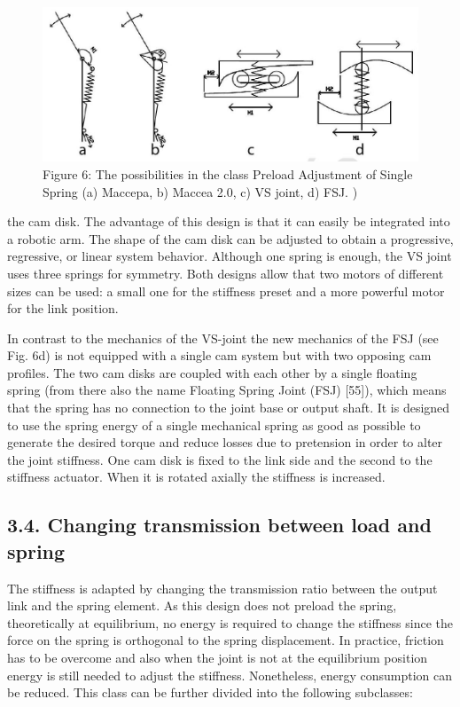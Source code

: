 \documentclass[10pt]{article}
\begin{document}
\begin{figure}[h]
\begin{center}
  \includegraphics[width=\textwidth]{2025_09_17_f0417c8723605e4ad1efg-14}
\captionsetup{labelformat=empty}
\caption{Figure 6: The possibilities in the class Preload Adjustment of Single Spring (a) Maccepa, b) Maccea 2.0, c) VS joint, d) FSJ. )}
\end{center}
\end{figure}

the cam disk. The advantage of this design is that it can easily be integrated into a robotic arm. The shape of the cam disk can be adjusted to obtain a progressive, regressive, or linear system behavior. Although one spring is enough, the VS joint uses three springs for symmetry. Both designs allow that two motors of different sizes can be used: a small one for the stiffness preset and a more powerful motor for the link position.

In contrast to the mechanics of the VS-joint the new mechanics of the FSJ (see Fig. 6d) is not equipped with a single cam system but with two opposing cam profiles. The two cam disks are coupled with each other by a single floating spring (from there also the name Floating Spring Joint (FSJ) [55]), which means that the spring has no connection to the joint base or output shaft. It is designed to use the spring energy of a single mechanical spring as good as possible to generate the desired torque and reduce losses due to pretension in order to alter the joint stiffness. One cam disk is fixed to the link side and the second to the stiffness actuator. When it is rotated axially the stiffness is increased.

\subsection*{3.4. Changing transmission between load and spring}
The stiffness is adapted by changing the transmission ratio between the output link and the spring element. As this design does not preload the spring, theoretically at equilibrium, no energy is required to change the stiffness since the force on the spring is orthogonal to the spring displacement. In practice, friction has to be overcome and also when the joint is not at the equilibrium position energy is still needed to adjust the stiffness. Nonetheless, energy consumption can be reduced. This class can be further divided into the following subclasses:
\end{document}
